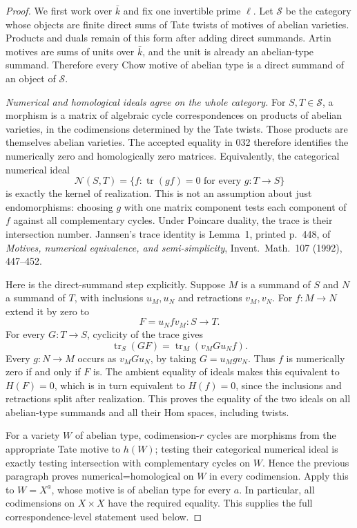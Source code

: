 \documentclass[11pt,a4paper]{article}
\begin{document}
\begin{proof}
We first work over $\bar k$ and fix one invertible prime $\ell$.
Let $\mathcal S$ be the category whose objects are finite direct
sums of Tate twists of motives of abelian varieties. Products and
duals remain of this form after adding direct summands. Artin
motives are sums of units over $\bar k$, and the unit is already
an abelian-type summand. Therefore every Chow motive of abelian
type is a direct summand of an object of $\mathcal S$.

\emph{Numerical and homological ideals agree on the whole category.}
For $S,T\in\mathcal S$, a morphism is a matrix of algebraic
cycle correspondences on products of abelian varieties, in the
codimensions determined by the Tate twists. Those products are
themselves abelian varieties. The accepted equality in 032
therefore identifies the numerically zero and homologically zero
matrices. Equivalently, the categorical numerical ideal
\[
 \mathcal N(S,T)
  =\{f:\operatorname{tr}(gf)=0\text{ for every }g:T\to S\}
                                                               \tag{JAC.P16.2}
\]
is exactly the kernel of realization. This is not an assumption
about just endomorphisms: choosing $g$ with one matrix component
tests each component of $f$ against all complementary cycles.
Under Poincare duality, the trace is their intersection number.
Jannsen's trace identity is Lemma~1, printed p.~448, of
\emph{Motives, numerical equivalence, and semi-simplicity},
Invent.\ Math.\ 107 (1992), 447--452.

Here is the direct-summand step explicitly. Suppose $M$ is a
summand of $S$ and $N$ a summand of $T$, with inclusions $u_M,u_N$
and retractions $v_M,v_N$. For $f:M\to N$ extend it by zero to
\[
                 F=u_N f v_M:S\longrightarrow T.
\]
For every $G:T\to S$, cyclicity of the trace gives
\[
 \operatorname{tr}_S(GF)
     =\operatorname{tr}_M(v_MG u_N f).                    \tag{JAC.P16.3}
\]
Every $g:N\to M$ occurs as $v_MG u_N$, by taking
$G=u_Mg v_N$. Thus $f$ is numerically zero if and only if $F$ is.
The ambient equality of ideals makes this equivalent to $H(F)=0$,
which is in turn equivalent to $H(f)=0$, since the inclusions and
retractions split after realization. This proves the equality of
the two ideals on all abelian-type summands and all their Hom
spaces, including twists.

For a variety $W$ of abelian type, codimension-$r$ cycles are
morphisms from the appropriate Tate motive to $h(W)$; testing
their categorical numerical ideal is exactly testing intersection
with complementary cycles on $W$. Hence the previous paragraph
proves numerical=homological on $W$ in every codimension.
Apply this to $W=X^a$, whose motive is of abelian type for every
$a$. In particular, all codimensions on $X\times X$ have the
required equality. This supplies the full correspondence-level
statement used below.


\end{proof}
\end{document}
